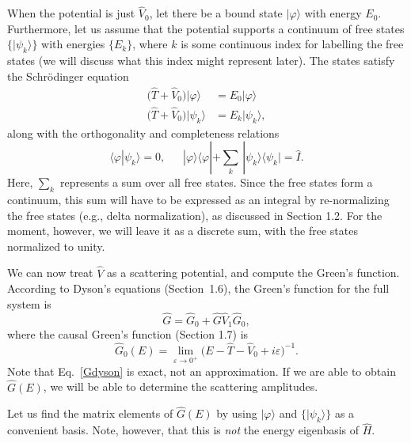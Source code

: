 \documentclass[pra,12pt]{revtex4}
\begin{document}
When the potential is just $\hat{V}_0$, let there be a bound state
$|\varphi\rangle$ with energy $E_0$.  Furthermore, let us assume that
the potential supports a continuum of free states $\{|\psi_k\rangle\}$
with energies $\{E_k\}$, where $k$ is some continuous index for
labelling the free states (we will discuss what this index might
represent later).  The states satisfy the Schr\"odinger equation
\begin{align}
  \big(\hat{T} + \hat{V}_0\big) |\varphi\rangle \; &= E_0 |\varphi\rangle \\ \big(\hat{T} + \hat{V}_0\big) |\psi_k\rangle &= E_k |\psi_k\rangle,
\end{align}
along with the orthogonality and completeness relations
\begin{equation}
  \langle\varphi|\psi_k\rangle = 0, \;\;\quad |\varphi\rangle\langle\varphi|
  + \sum_k \, |\psi_k\rangle\langle\psi_k| = \hat{I}.
\end{equation}
Here, $\sum_k$ represents a sum over all free states.  Since the free
states form a continuum, this sum will have to be expressed as an
integral by re-normalizing the free states (e.g., delta
normalization), as discussed in Section 1.2.  For the moment, however,
we will leave it as a discrete sum, with the free states normalized to
unity.

We can now treat $\hat{V}$ as a scattering potential, and compute the
Green's function.  According to Dyson's equations (Section~1.6), the
Green's function for the full system is
\begin{equation}
  \hat{G} = \hat{G}_0 + \hat{G} \hat{V}_1 \hat{G}_0,
  \label{Gdyson}
\end{equation}
where the causal Green's function (Section 1.7) is
\begin{equation}
  \hat{G}_0(E) = \lim_{\varepsilon\rightarrow0^+}
  \Big(E - \hat{T} - \hat{V}_0 + i\varepsilon\Big)^{-1}.
\end{equation}
Note that Eq.~\eqref{Gdyson} is exact, not an approximation.  If we
are able to obtain $\hat{G}(E)$, we will be able to determine the
scattering amplitudes.

Let us find the matrix elements of $\hat{G}(E)$ by using
$|\varphi\rangle$ and $\{|\psi_k\rangle\}$ as a convenient basis.
Note, however, that this is \textit{not} the energy eigenbasis of
$\hat{H}$.
\end{document}
